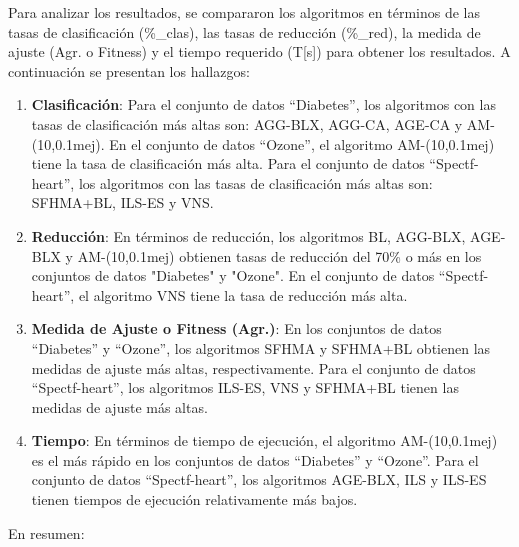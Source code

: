 Para analizar los resultados, se compararon los algoritmos en términos de las tasas de clasificación (\%\_clas), las tasas de reducción (\%\_red), la medida de ajuste (Agr. o Fitness) y el tiempo requerido (T[s]) para obtener los resultados. A continuación se presentan los hallazgos:

\begin{enumerate}
	\item \textbf{Clasificación}: Para el conjunto de datos ``Diabetes'', los algoritmos con las tasas de clasificación más altas son: AGG-BLX, AGG-CA, AGE-CA y AM-(10,0.1mej).
	En el conjunto de datos ``Ozone'', el algoritmo AM-(10,0.1mej) tiene la tasa de clasificación más alta. 	Para el conjunto de datos ``Spectf-heart'', los algoritmos con las tasas de clasificación más altas son: SFHMA+BL, ILS-ES y VNS.
	
	\item \textbf{Reducción}: En términos de reducción, los algoritmos BL, AGG-BLX, AGE-BLX y AM-(10,0.1mej) obtienen tasas de reducción del 70\% o más en los conjuntos de datos "Diabetes" y "Ozone". En el conjunto de datos ``Spectf-heart'', el algoritmo VNS tiene la tasa de reducción más alta.
	
	\item \textbf{Medida de Ajuste o Fitness (Agr.)}: En los conjuntos de datos ``Diabetes'' y ``Ozone'', los algoritmos SFHMA y SFHMA+BL obtienen las medidas de ajuste más altas, respectivamente. Para el conjunto de datos ``Spectf-heart'', los algoritmos ILS-ES, VNS y SFHMA+BL tienen las medidas de ajuste más altas.
	
	\item \textbf{Tiempo}: En términos de tiempo de ejecución, el algoritmo AM-(10,0.1mej) es el más rápido en los conjuntos de datos ``Diabetes'' y ``Ozone''. Para el conjunto de datos ``Spectf-heart'', los algoritmos AGE-BLX, ILS y ILS-ES tienen tiempos de ejecución relativamente más bajos.
\end{enumerate}

En resumen:


